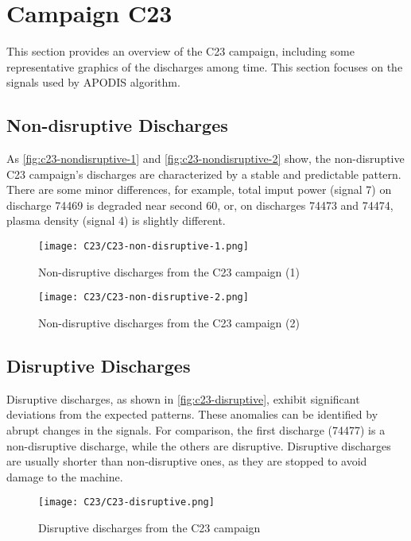 \chapter{Campaign C23}\label{sec:c23}

This section provides an overview of the C23 campaign, including some representative graphics of the discharges among time. This section focuses on the signals used by \ac{APODIS} algorithm.

\section{Non-disruptive Discharges}

As \autoref{fig:c23-nondisruptive-1} and \autoref{fig:c23-nondisruptive-2} show, the non-disruptive C23 campaign's discharges are characterized by a stable and predictable pattern. There are some minor differences, for example, total imput power (signal 7) on discharge 74469 is degraded near second 60, or, on discharges 74473 and 74474, plasma density (signal 4) is slightly different.

\begin{figure}[H]
    \centering
    \texttt{[image: C23/C23-non-disruptive-1.png]}
    \caption{Non-disruptive discharges from the C23 campaign (1)}
    \label{fig:c23-nondisruptive-1}    
\end{figure}

\begin{figure}[H]
    \centering
    \texttt{[image: C23/C23-non-disruptive-2.png]}
    \caption{Non-disruptive discharges from the C23 campaign (2)}
    \label{fig:c23-nondisruptive-2}    
\end{figure}

\section{Disruptive Discharges}

Disruptive discharges, as shown in \autoref{fig:c23-disruptive}, exhibit significant deviations from the expected patterns. These anomalies can be identified by abrupt changes in the signals. For comparison, the first discharge (74477) is a non-disruptive discharge, while the others are disruptive. Disruptive discharges are usually shorter than non-disruptive ones, as they are stopped to avoid damage to the machine. 

\begin{figure}[H]
    \centering
    \texttt{[image: C23/C23-disruptive.png]}
    \caption{Disruptive discharges from the C23 campaign}
    \label{fig:c23-disruptive}    
\end{figure}
